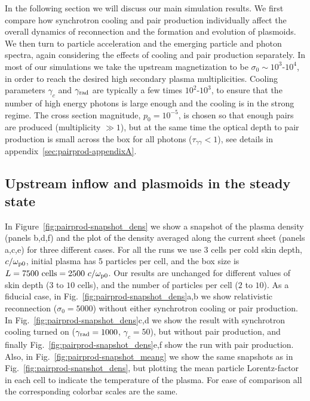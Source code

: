 
In the following section we will discuss our main simulation results. We first compare how synchrotron cooling and pair production individually affect the overall dynamics of reconnection and the formation and evolution of plasmoids. We then turn to particle acceleration and the emerging particle and photon spectra, again considering the effects of cooling and pair production separately. In most of our simulations we take the upstream magnetization to be $\sigma_0\sim 10^3\text{-}10^4$, in order to reach the desired high secondary plasma multiplicities. Cooling parameters $\gamma_c$ and $\gamma_{\rm rad}$ are typically a few times $10^2\text{-}10^3$, to ensure that the number of high energy photons is large enough and the cooling is in the strong regime. The cross section magnitude, $p_0=10^{-5}$, is chosen so that enough pairs are produced (multiplicity $\gg 1$), but at the same time the optical depth to pair production is small across the box for all photons ($\tau_{\gamma\gamma}<1$), see details in appendix~\ref{sec:pairprod-appendixA}.

\subsection*{Upstream inflow and plasmoids in the steady state}

In Figure~\ref{fig:pairprod-snapshot_dens} we show a snapshot of the plasma density (panels b,d,f) and the plot of the density averaged along the current sheet (panels a,c,e) for three different cases. For all the runs we use 3 cells per cold skin depth, $c/\omega_{\rm p0}$, initial plasma has 5 particles per cell, and the box size is  $L=7500~\text{cells}=2500~c/\omega_{\rm p0}$. Our results are unchanged for different values of skin depth ($3$ to $10$ cells), and the number of particles per cell ($2$ to $10$). As a fiducial case, in Fig.~\ref{fig:pairprod-snapshot_dens}a,b we show relativistic reconnection ($\sigma_0=5000$) without either synchrotron cooling or pair production. In Fig.~\ref{fig:pairprod-snapshot_dens}c,d we show the result with synchrotron cooling turned on ($\gamma_{\rm rad}=1000$, $\gamma_c=50$), but without pair production, and finally Fig.~\ref{fig:pairprod-snapshot_dens}e,f show the run with pair production. Also, in Fig.~\ref{fig:pairprod-snapshot_meang} we show the same snapshots as in Fig.~\ref{fig:pairprod-snapshot_dens}, but plotting the mean particle Lorentz-factor in each cell to indicate the temperature of the plasma. For ease of comparison all the corresponding colorbar scales are the same.

